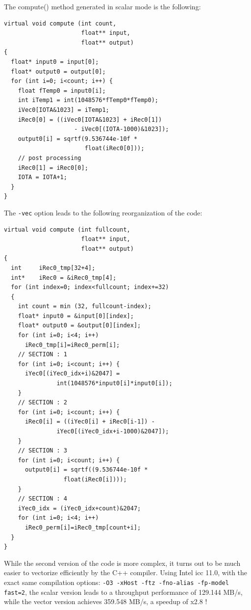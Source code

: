 \documentclass[a4paper,10pt]{book}
\begin{document}
The compute() method generated in scalar mode is the following:

\begin{lstlisting}
virtual void compute (int count, 
                      float** input, 
                      float** output) 
{
  float* input0 = input[0];
  float* output0 = output[0];
  for (int i=0; i<count; i++) {
    float fTemp0 = input0[i];
    int iTemp1 = int(1048576*fTemp0*fTemp0);
    iVec0[IOTA&1023] = iTemp1;
    iRec0[0] = ((iVec0[IOTA&1023] + iRec0[1])
                    - iVec0[(IOTA-1000)&1023]);
    output0[i] = sqrtf(9.536744e-10f * 
                       float(iRec0[0]));
    // post processing
    iRec0[1] = iRec0[0];
    IOTA = IOTA+1;
  }
}
\end{lstlisting}

The \lstinline!-vec! option leads to the following reorganization of the code:
\begin{lstlisting}
virtual void compute (int fullcount, 
                      float** input, 
                      float** output) 
{
  int     iRec0_tmp[32+4];
  int*    iRec0 = &iRec0_tmp[4];
  for (int index=0; index<fullcount; index+=32) 
  {
    int count = min (32, fullcount-index);
    float* input0 = &input[0][index];
    float* output0 = &output[0][index];
    for (int i=0; i<4; i++) 
      iRec0_tmp[i]=iRec0_perm[i];
    // SECTION : 1
    for (int i=0; i<count; i++) {
      iYec0[(iYec0_idx+i)&2047] =
               int(1048576*input0[i]*input0[i]);
    }
    // SECTION : 2
    for (int i=0; i<count; i++) {
      iRec0[i] = ((iYec0[i] + iRec0[i-1]) - 
               iYec0[(iYec0_idx+i-1000)&2047]);
    }
    // SECTION : 3
    for (int i=0; i<count; i++) {
      output0[i] = sqrtf((9.536744e-10f * 
                 float(iRec0[i])));
    }
    // SECTION : 4
    iYec0_idx = (iYec0_idx+count)&2047;
    for (int i=0; i<4; i++)
      iRec0_perm[i]=iRec0_tmp[count+i];
  }
}
\end{lstlisting}

While the second version of the code is more complex, it turns out to be much easier to vectorize efficiently by the C++ compiler. Using Intel icc 11.0, with the exact same compilation options: \texttt{-O3 -xHost -ftz -fno-alias -fp-model fast=2}, the scalar version leads to a throughput performance of 129.144  MB/s, while the vector version achieves 359.548  MB/s, a speedup of x2.8 ! 
\end{document}
